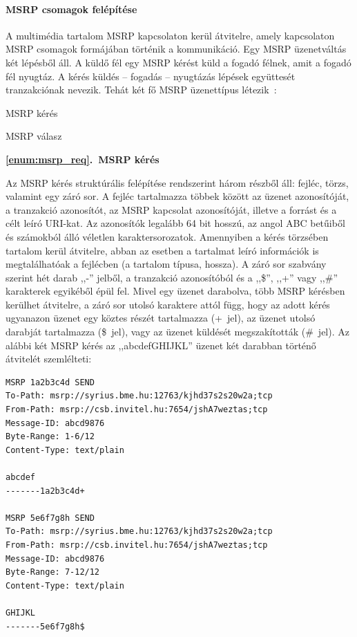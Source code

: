 \paragraph{MSRP csomagok felépítése\\}
\label{sec:msrp_chunks}

A multimédia tartalom MSRP kapcsolaton kerül átvitelre, amely kapcsolaton MSRP csomagok formájában történik a kommunikáció. Egy MSRP üzenetváltás két lépésből áll. A küldő fél egy MSRP kérést küld a fogadó félnek, amit a fogadó fél nyugtáz. A kérés küldés -- fogadás -- nyugtázás lépések együttesét tranzakciónak nevezik. Tehát két fő MSRP üzenettípus létezik~\cite{rfc4975}:
\begin{myenumerate}
\item \label{enum:msrp_req} MSRP kérés
\item \label{enum:msrp_resp} MSRP válasz
\end{myenumerate}
\bigskip

\noindent
{\bf \ref{enum:msrp_req}.~MSRP kérés}

Az MSRP kérés struktúrális felépítése rendszerint három részből áll: fejléc, törzs, valamint egy záró sor. A fejléc tartalmazza többek között az üzenet azonosítóját, a tranzakció azonosítót, az MSRP kapcsolat azonosítóját, illetve a forrást és a célt leíró URI-kat. Az azonosítók legalább 64 bit hosszú, az angol ABC betűiből és számokból álló véletlen karaktersorozatok. Amennyiben a kérés törzsében tartalom kerül átvitelre, abban az esetben a tartalmat leíró információk is megtalálhatóak a fejlécben (a tartalom típusa, hossza). A záró sor szabvány szerint hét darab ,,-'' jelből, a tranzakció azonosítóból és a ,,\$'', ,,+'' vagy ,,\#'' karakterek egyikéből épül fel. Mivel egy üzenet darabolva, több MSRP kérésben kerülhet átvitelre, a záró sor utolsó karaktere attól függ, hogy az adott kérés ugyanazon üzenet egy köztes részét tartalmazza (+~jel), az üzenet utolsó darabját tartalmazza (\$~jel), vagy az üzenet küldését megszakították (\#~jel). Az alábbi két MSRP kérés az ,,abcdefGHIJKL'' üzenet két darabban történő átvitelét szemlélteti:

\fontsize{10}{10}
\begin{verbatim}
MSRP 1a2b3c4d SEND
To-Path: msrp://syrius.bme.hu:12763/kjhd37s2s20w2a;tcp
From-Path: msrp://csb.invitel.hu:7654/jshA7weztas;tcp
Message-ID: abcd9876
Byte-Range: 1-6/12
Content-Type: text/plain

abcdef
-------1a2b3c4d+

MSRP 5e6f7g8h SEND
To-Path: msrp://syrius.bme.hu:12763/kjhd37s2s20w2a;tcp
From-Path: msrp://csb.invitel.hu:7654/jshA7weztas;tcp
Message-ID: abcd9876
Byte-Range: 7-12/12
Content-Type: text/plain

GHIJKL
-------5e6f7g8h$
\end{verbatim}
\fontsize{12}{12} 

